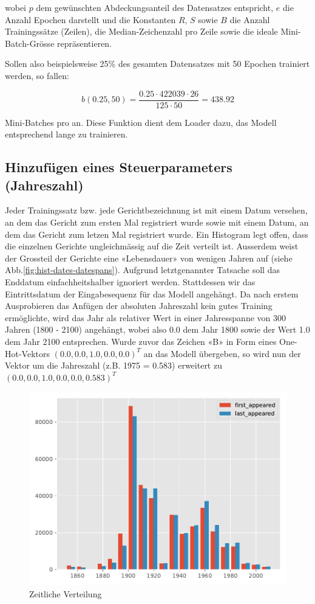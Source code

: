 wobei $ p $ dem gewünschten Abdeckungsanteil des Datensatzes entspricht, $ e $ die Anzahl Epochen darstellt und die Konstanten $ R $, $ S $ sowie $ B $ die Anzahl Trainingssätze (Zeilen), die Median-Zeichenzahl pro Zeile sowie
die ideale Mini-Batch-Grösse repräsentieren.

Sollen also beispielsweise 25\% des gesamten Datensatzes mit 50 Epochen trainiert werden, so fallen:

\[ b(0.25, 50) = \frac{0.25 \cdot 422039 \cdot 26}{125 \cdot 50} = 438.92 \]

Mini-Batches pro an.
Diese Funktion dient dem Loader dazu, das Modell entsprechend lange zu trainieren.

\subsection{Hinzufügen eines Steuerparameters (Jahreszahl)}
\label{subsec:adding-time-component}

Jeder Trainingssatz bzw. jede Gerichtbezeichnung ist mit einem Datum versehen, an dem das Gericht zum ersten Mal
registriert wurde sowie mit einem Datum, an dem das Gericht zum letzen Mal registriert wurde.
Ein Histogram legt offen, dass die einzelnen Gerichte ungleichmässig auf die Zeit verteilt ist.
Ausserdem weist der Grossteil der Gerichte eine «Lebensdauer» von wenigen Jahren auf (siehe Abb.\ref{fig:hist-dates-datespans}).
Aufgrund letztgenannter Tatsache soll das Enddatum einfachheitshalber ignoriert werden.
Stattdessen wir das Eintrittsdatum der Eingabesequenz für das Modell angehängt.
Da nach erstem Ausprobieren das Anfügen der absoluten Jahreszahl kein gutes Training ermöglichte, wird das Jahr
als relativer Wert in einer Jahresspanne von 300 Jahren (1800 - 2100) angehängt, wobei also 0.0 dem Jahr 1800 sowie
der Wert 1.0 dem Jahr 2100 entsprechen.
Wurde zuvor das Zeichen «B» in Form eines One-Hot-Vektors $ (0.0, 0.0, 1.0, 0.0, 0.0)^{T} $ an das Modell übergeben,
so wird nun der Vektor um die Jahreszahl (z.B. 1975 = 0.583) erweitert zu $ (0.0, 0.0, 1.0, 0.0, 0.0, 0.583)^{T} $

\begin{figure}
    \centering
    \includegraphics[width=0.75\linewidth]{images/analysis/histogram-dates.pdf}
    \caption{Zeitliche Verteilung}
    \label{fig:hist-dates-dates}
\end{figure}
